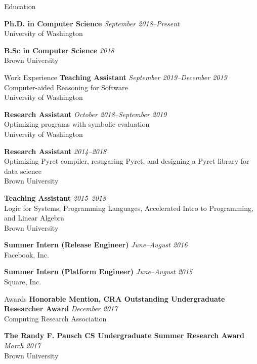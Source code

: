 \documentclass{resume} %
\begin{document}
\begin{rSection}{Education}

{\bf Ph.D. in Computer Science} \hfill {\em September 2018--Present} \\ 
University of Washington 

{\bf B.Sc in Computer Science} \hfill {\em 2018} \\
Brown University  

\end{rSection}

\begin{rSection}{Work Experience}
  {\bf Teaching Assistant} \hfill {\em September 2019--December 2019} \\ 
  Computer-aided Reasoning for Software \\
  University of Washington

  {\bf Research Assistant} \hfill {\em October 2018--September 2019} \\ 
  Optimizing programs with symbolic evaluation \\
  University of Washington

  {\bf Research Assistant} \hfill {\em 2014--2018} \\ 
  Optimizing Pyret compiler, resugaring Pyret, and designing a Pyret library for data science\\
  Brown University

  {\bf Teaching Assistant} \hfill {\em 2015--2018} \\ 
  Logic for Systems, Programming Languages, Accelerated Intro to Programming, and Linear Algebra \\
  Brown University
  
  {\bf Summer Intern (Release Engineer)} \hfill {\em June--August 2016} \\ 
  Facebook, Inc. 

  {\bf Summer Intern (Platform Engineer)} \hfill {\em June--August 2015} \\
  Square, Inc.  

\end{rSection}

\begin{rSection}{Awards}
{\bf Honorable Mention, CRA Outstanding Undergraduate Researcher Award} \hfill {\em December 2017} \\
Computing Research Association

{\bf The Randy F. Pausch CS Undergraduate Summer Research Award} \hfill {\em March 2017} \\
Brown University
\end{rSection}
\end{document}
